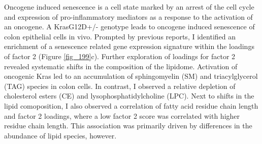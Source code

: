 \begin{flushleft}
Oncogene induced senescence is a cell state marked by an arrest of the cell cycle and expression of pro-inflammatory mediators as a response to the activation of an oncogene. A KrasG12D+/- genotype leads to oncogene induced senescence of colon epithelial cells in vivo. 
Prompted by previous reports, I identified an enrichment of a senescence related gene expression signature within the loadings of factor 2 (Figure \ref{fig_199}c).
Further exploration of loadings for factor 2 revealed systematic shifts in the composition of the lipidome. Activation of oncogenic Kras led to an accumulation of sphingomyelin (SM) and triacylglycerol (TAG) species in colon cells. In contrast, I observed a relative depletion of cholesterol esters (CE) and lysophosphatidylcholine (LPC). Next to shifts in the lipid comoposition, I also observed a correlation of fatty acid residue chain length and factor 2 loadings, where a low factor 2 score was correlated with higher residue chain length. This association was primarily driven by differences in the abundance of lipid species, however. 


\end{flushleft}
